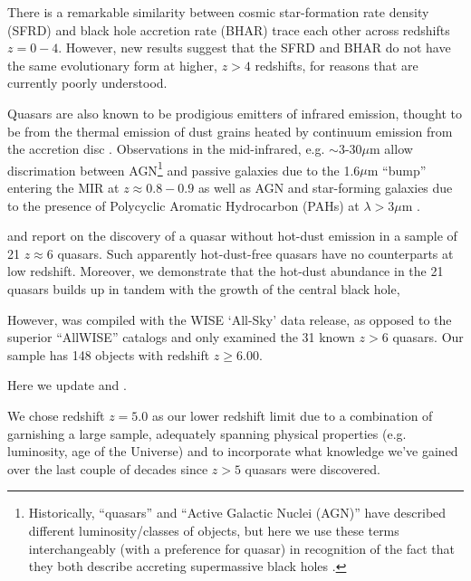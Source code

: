 \documentclass[usenatbib]{mnras}
\begin{document}
There is a remarkable similarity between cosmic star-formation rate
density (SFRD) and black hole accretion rate (BHAR) trace each other
\citep[with a normalisation factor of $\sim3000$,][]{Willott2013b,
MadauDickinson2014} across redshifts $z=0-4$.  However, new results
\citet[e.g., ][]{Vito2018a, Calhau2018} suggest that the SFRD and BHAR
do not have the same evolutionary form at higher, $z>4$ redshifts, for
reasons that are currently poorly understood.

Quasars are also known to be prodigious emitters of infrared emission,
thought to be from the thermal emission of dust grains heated by
continuum emission from the accretion disc \citep[][]{Hill2014,
Hickox2017}.  Observations in the mid-infrared, e.g. $\sim$3-30$\mu$m
allow discrimation between AGN\footnote{Historically, ``quasars'' and
``Active Galactic Nuclei (AGN)'' have described different
luminosity/classes of objects, but here we use these terms
interchangeably (with a preference for quasar) in recognition of the
fact that they both describe accreting supermassive black holes
\citep[e.g.][]{Haardt2016book}.}  and passive galaxies due to the
1.6$\mu$m ``bump'' entering the MIR at $z\approx0.8-0.9$ \citep[e.g.,
][]{Wright1994, Sawicki2002, Lacy2004, Stern2005, Richards2006b, Timlin2016} as
well as AGN and star-forming galaxies due to the presence of
Polycyclic Aromatic Hydrocarbon (PAHs) at $\lambda >3\mu$m
\citep[e.g., ][]{Yan2007, Tielens2008}.

\citet{Jiang2006dust} and \citet{Jiang2010} report on the discovery of
a quasar without hot-dust emission in a sample of 21 $z\approx6$
quasars. Such apparently hot-dust-free quasars have no counterparts at
low redshift. Moreover, we demonstrate that the hot-dust abundance in
the 21 quasars builds up in tandem with the growth of the central
black hole,

However, \citet{Blain2013} was compiled with the WISE `All-Sky' 
data release, as opposed to the superior ``AllWISE'' catalogs and 
only examined the 31 known $z>6$ quasars. Our sample has 
148 objects with redshift $z\geq6.00$. 

Here we update \citet{Jiang2010}  and \citet{Blain2013} 
\citep[along with Table 8 of][]{Banados2016}. 

We chose redshift $z=5.0$ as our lower redshift limit due to a combination 
of garnishing a large sample, adequately spanning physical properties 
(e.g. luminosity, age of the Universe) and to incorporate what knowledge 
we've gained over the last couple of decades since $z>5$ quasars were 
discovered. 
\end{document}
